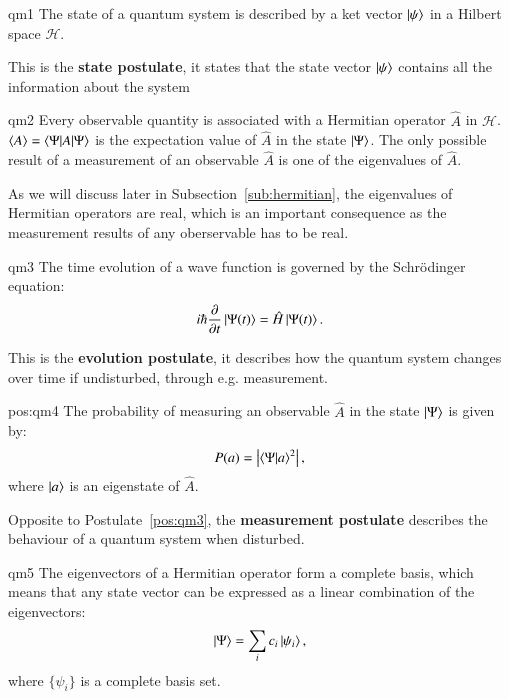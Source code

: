 \begin{postulate}{}{qm1}
	The state of a quantum system is described by a ket vector $ \ket{\psi} $ in a Hilbert space $ \mathcal{H} $.
\end{postulate}
This is the \textbf{state postulate}, it states that the state vector $\ket{\psi}$ contains all the information about the system

\begin{postulate}{}{qm2}
	Every observable quantity is associated with a Hermitian operator $ \hat A $ in $ \mathcal{H} $. $\braket{A} = \braket{\Psi|A|\Psi}$ is the expectation value of $ \hat A $ in the state $ \ket{\Psi} $. The only possible result of a measurement of an observable $ \hat A $ is one of the eigenvalues of $ \hat A $.
\end{postulate}
As we will discuss later in Subsection~\ref{sub:hermitian}, the eigenvalues of Hermitian operators are real, which is an important consequence as the measurement results of any oberservable has to be real.
\begin{postulate}{}{qm3}
	The time evolution of a wave function is governed by the Schr{\"o}dinger equation:
	\begin{equation}
		i\hbar\frac{\partial}{\partial t}\ket{\Psi(t)} = \hat H\ket{\Psi(t)}.
	\end{equation}
\end{postulate}
This is the \textbf{evolution postulate}, it describes how the quantum system changes over time if undisturbed, through e.g. measurement.


\begin{postulate}{}{pos:qm4}
	The probability of measuring an observable $ \hat A $ in the state $ \ket{\Psi} $ is given by:
	\begin{equation}
		P(a) = \left | {\braket{\Psi|a}}^2 \right |,
	\end{equation}
	where $ \ket{a} $ is an eigenstate of $ \hat A $.
\end{postulate}
Opposite to Postulate~\ref{pos:qm3}, the \textbf{measurement postulate} describes the behaviour of a quantum system when disturbed.

\begin{postulate}{}{qm5}
	The eigenvectors of a Hermitian operator form a complete basis, which means that any state vector can be expressed as a linear combination of the eigenvectors:
	\begin{equation}
		\ket{\Psi} = \sum_{i} c_i \ket{\psi_i},
	\end{equation}
where $ \{ \psi_i \}  $ is a complete basis set. 
\end{postulate}

